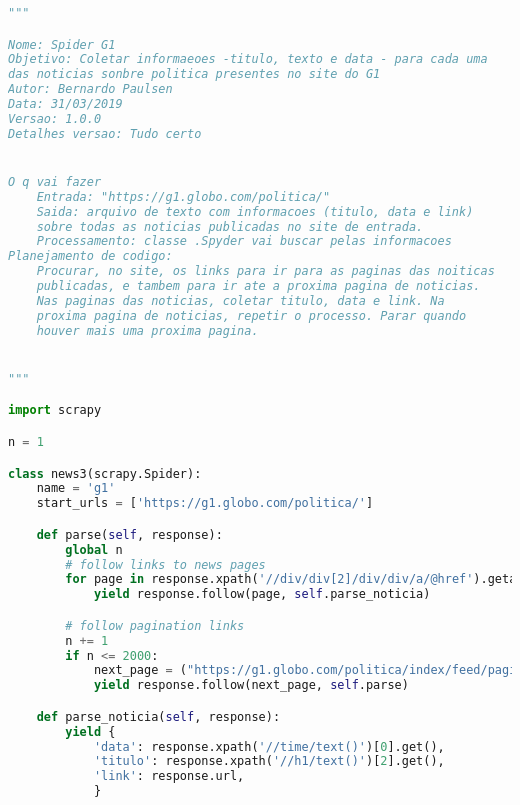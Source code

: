 \begin{lstlisting}[language=Python]
"""

Nome: Spider G1
Objetivo: Coletar informaeoes -titulo, texto e data - para cada uma
das noticias sonbre politica presentes no site do G1
Autor: Bernardo Paulsen
Data: 31/03/2019
Versao: 1.0.0
Detalhes versao: Tudo certo 


O q vai fazer
    Entrada: "https://g1.globo.com/politica/"
    Saida: arquivo de texto com informacoes (titulo, data e link)
    sobre todas as noticias publicadas no site de entrada.
    Processamento: classe .Spyder vai buscar pelas informacoes
Planejamento de codigo:
    Procurar, no site, os links para ir para as paginas das noiticas
    publicadas, e tambem para ir ate a proxima pagina de noticias.
    Nas paginas das noticias, coletar titulo, data e link. Na
    proxima pagina de noticias, repetir o processo. Parar quando
    houver mais uma proxima pagina.


"""

import scrapy

n = 1

class news3(scrapy.Spider):
    name = 'g1'
    start_urls = ['https://g1.globo.com/politica/']

    def parse(self, response):
        global n
        # follow links to news pages
        for page in response.xpath('//div/div[2]/div/div/a/@href').getall():
            yield response.follow(page, self.parse_noticia)

        # follow pagination links
        n += 1
        if n <= 2000:
            next_page = ("https://g1.globo.com/politica/index/feed/pagina-%d.ghtml" % (n))
            yield response.follow(next_page, self.parse)

    def parse_noticia(self, response):
        yield {
            'data': response.xpath('//time/text()')[0].get(),
            'titulo': response.xpath('//h1/text()')[2].get(),
            'link': response.url,
            }

\end{lstlisting}